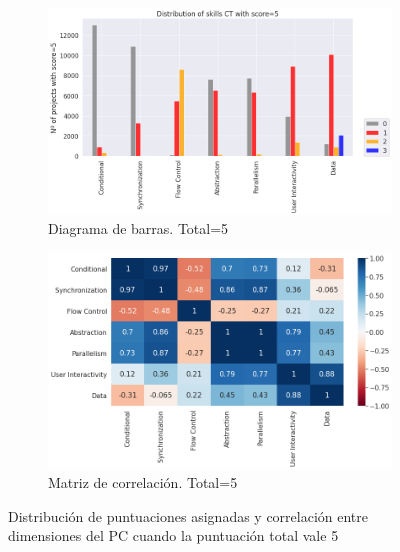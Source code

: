 \documentclass[a4paper, 12pt]{book}
\begin{document}
\begin{figure}[H]
    \centering
    \begin{subfigure}[h]{.49\textwidth} 
        \includegraphics[width=\textwidth]{img/distribucion_5_Snap}
        \caption{Diagrama de barras. Total=5}
        \label{fig:total5_Snap}
    \end{subfigure}       
    \begin{subfigure}[h]{.49\textwidth} 
        \includegraphics[width=\textwidth]{img/corr_5_Snap}
        \caption{Matriz de correlación. Total=5}
        \label{fig:corr5_Snap}
    \end{subfigure}
    \caption{Distribución de puntuaciones asignadas y correlación entre dimensiones del PC cuando la puntuación total vale 5}
\end{figure}
\end{document}

